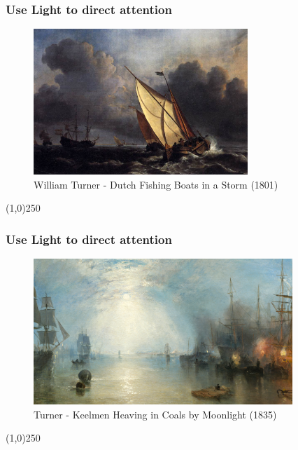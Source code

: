 \begin{frame}
\frametitle{Use Light to direct attention}
\begin{figure}
	\centering
		\includegraphics[height=5.5cm]{img/candc/TurnerFishingBoatsStorm.jpg}
	\caption{William Turner - Dutch Fishing Boats in a Storm (1801)}
	\label{fig:WilliamTurnerFishingBoat}
\end{figure}
\end{frame}
\begin{center}\line(1,0){250}\end{center}



\begin{frame}
\frametitle{Use Light to direct attention}
\begin{figure}
	\centering
		\includegraphics[height=5.5cm]{img/candc/TurnerCoal-by-Moonlight.jpg}
	\caption{Turner - Keelmen Heaving in Coals by Moonlight (1835)}
	\label{fig:williamTurnerKeelmen}
\end{figure}
\end{frame}
\begin{center}\line(1,0){250}\end{center}




